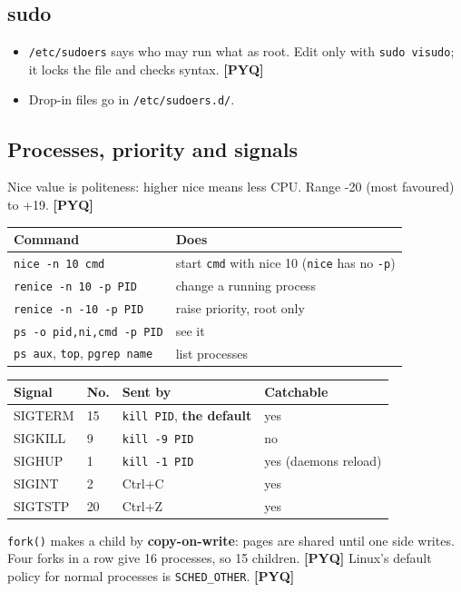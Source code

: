 \documentclass[11pt,a4paper]{article}
\newcommand{\pyq}{\textcolor{ember}{\scriptsize\textbf{[PYQ]}}}
\begin{document}
\subsection{sudo}
\begin{itemize}
\item \texttt{/etc/sudoers} says who may run what as root. Edit only with \texttt{sudo visudo}; it locks the file and checks syntax. \pyq{}
\item Drop-in files go in \texttt{/etc/sudoers.d/}.
\end{itemize}
\subsection{Processes, priority and signals}
Nice value is politeness: higher nice means less CPU. Range -20 (most favoured) to +19. \pyq{}

\begin{center}\small\renewcommand{\arraystretch}{1.18}\setlength{\tabcolsep}{9pt}
\begin{tabularx}{\linewidth}{@{}>{\raggedright\arraybackslash}X>{\raggedright\arraybackslash}X@{}}
\toprule
\textbf{\color{slate}Command} & \textbf{\color{slate}Does} \\ \midrule
\texttt{nice -n 10 cmd} & start \texttt{cmd} with nice 10 (\texttt{nice} has no \texttt{-p}) \\
\texttt{renice -n 10 -p PID} & change a running process \\
\texttt{renice -n -10 -p PID} & raise priority, root only \\
\texttt{ps -o pid,ni,cmd -p PID} & see it \\
\texttt{ps aux}, \texttt{top}, \texttt{pgrep name} & list processes \\
\bottomrule
\end{tabularx}\end{center}
\begin{center}\small\renewcommand{\arraystretch}{1.18}\setlength{\tabcolsep}{9pt}
\begin{tabularx}{\linewidth}{@{}ll>{\raggedright\arraybackslash}X>{\raggedright\arraybackslash}X@{}}
\toprule
\textbf{\color{slate}Signal} & \textbf{\color{slate}No.} & \textbf{\color{slate}Sent by} & \textbf{\color{slate}Catchable} \\ \midrule
SIGTERM & 15 & \texttt{kill PID}, \textbf{the default} & yes \\
SIGKILL & 9 & \texttt{kill -9 PID} & no \\
SIGHUP & 1 & \texttt{kill -1 PID} & yes (daemons reload) \\
SIGINT & 2 & Ctrl+C & yes \\
SIGTSTP & 20 & Ctrl+Z & yes \\
\bottomrule
\end{tabularx}\end{center}
\texttt{fork()} makes a child by \textbf{copy-on-write}: pages are shared until one side writes. Four forks in a row give 16 processes, so 15 children. \pyq{} Linux's default policy for normal processes is \texttt{SCHED\_OTHER}. \pyq{}
\end{document}
